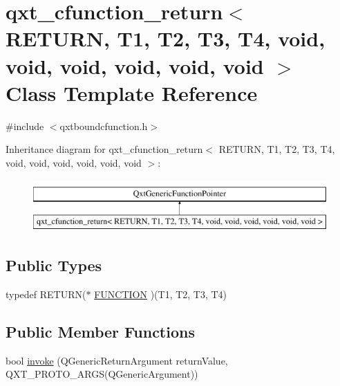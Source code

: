 \hypertarget{classqxt__cfunction__return_3_01_r_e_t_u_r_n_00_01_t1_00_01_t2_00_01_t3_00_01_t4_00_01void_00_01cb1f9557addb597e90ffc938f21cd8d1}{\section{qxt\-\_\-cfunction\-\_\-return$<$ R\-E\-T\-U\-R\-N, T1, T2, T3, T4, void, void, void, void, void, void $>$ Class Template Reference}
\label{classqxt__cfunction__return_3_01_r_e_t_u_r_n_00_01_t1_00_01_t2_00_01_t3_00_01_t4_00_01void_00_01cb1f9557addb597e90ffc938f21cd8d1}
}


{\ttfamily \#include $<$qxtboundcfunction.\-h$>$}

Inheritance diagram for qxt\-\_\-cfunction\-\_\-return$<$ R\-E\-T\-U\-R\-N, T1, T2, T3, T4, void, void, void, void, void, void $>$\-:\begin{figure}[H]
\begin{center}
\leavevmode
\includegraphics[height=2.000000cm]{classqxt__cfunction__return_3_01_r_e_t_u_r_n_00_01_t1_00_01_t2_00_01_t3_00_01_t4_00_01void_00_01cb1f9557addb597e90ffc938f21cd8d1}
\end{center}
\end{figure}
\subsection*{Public Types}
\begin{DoxyCompactItemize}
\item 
typedef R\-E\-T\-U\-R\-N($\ast$ \hyperlink{classqxt__cfunction__return_3_01_r_e_t_u_r_n_00_01_t1_00_01_t2_00_01_t3_00_01_t4_00_01void_00_01cb1f9557addb597e90ffc938f21cd8d1_a88574753c1a7327ff86684c842d057ef}{F\-U\-N\-C\-T\-I\-O\-N} )(T1, T2, T3, T4)
\end{DoxyCompactItemize}
\subsection*{Public Member Functions}
\begin{DoxyCompactItemize}
\item 
bool \hyperlink{classqxt__cfunction__return_3_01_r_e_t_u_r_n_00_01_t1_00_01_t2_00_01_t3_00_01_t4_00_01void_00_01cb1f9557addb597e90ffc938f21cd8d1_a0bc969d37e249a078697134e78cac45e}{invoke} (Q\-Generic\-Return\-Argument return\-Value, Q\-X\-T\-\_\-\-P\-R\-O\-T\-O\-\_\-A\-R\-G\-S(Q\-Generic\-Argument))
\end{DoxyCompactItemize}
